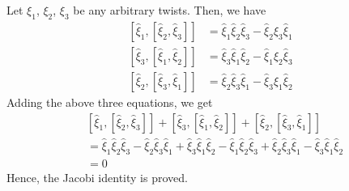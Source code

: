 Let \( \xi_{1} \), \( \xi_{2} \), \( \xi_{3} \) be any arbitrary twists.
Then, we have
\begin{align*}
    \left[\widehat{\xi}_{1},\left[\widehat{\xi}_{2}, \widehat{\xi}_{3}\right]\right]
     & =
    \widehat{\xi}_{1} \widehat{\xi}_{2} \widehat{\xi}_{3}-\widehat{\xi}_{2} \widehat{\xi}_{3} \widehat{\xi}_{1}
    \\
    \left[\widehat{\xi}_{3},\left[\widehat{\xi}_{1}, \widehat{\xi}_{2}\right]\right]
     & =
    \widehat{\xi}_{3} \widehat{\xi}_{1} \widehat{\xi}_{2}-\widehat{\xi}_{1} \widehat{\xi}_{2} \widehat{\xi}_{3}
    \\
    \left[\widehat{\xi}_{2},\left[\widehat{\xi}_{3}, \widehat{\xi}_{1}\right]\right]
     & =
    \widehat{\xi}_{2} \widehat{\xi}_{3} \widehat{\xi}_{1}-\widehat{\xi}_{3} \widehat{\xi}_{1} \widehat{\xi}_{2}
\end{align*}
Adding the above three equations, we get
\begin{align*}
     &
    \left[\widehat{\xi}_{1},\left[\widehat{\xi}_{2}, \widehat{\xi}_{3}\right]\right]+\left[\widehat{\xi}_{3},\left[\widehat{\xi}_{1}, \widehat{\xi}_{2}\right]\right]+\left[\widehat{\xi}_{2},\left[\widehat{\xi}_{3}, \widehat{\xi}_{1}\right]\right]
    \\ & =
    \widehat{\xi}_{1} \widehat{\xi}_{2} \widehat{\xi}_{3}-\widehat{\xi}_{2} \widehat{\xi}_{3} \widehat
    {\xi}_{1}+\widehat{\xi}_{3} \widehat{\xi}_{1} \widehat{\xi}_{2}-\widehat{\xi}_{1} \widehat{\xi}_{2} \widehat{\xi}_{3}+\widehat{\xi}_{2} \widehat{\xi}_{3} \widehat{\xi}_{1}-\widehat{\xi}_{3} \widehat{\xi}_{1} \widehat{\xi}_{2}
    \\ & =
    0
\end{align*}
Hence, the Jacobi identity is proved.

